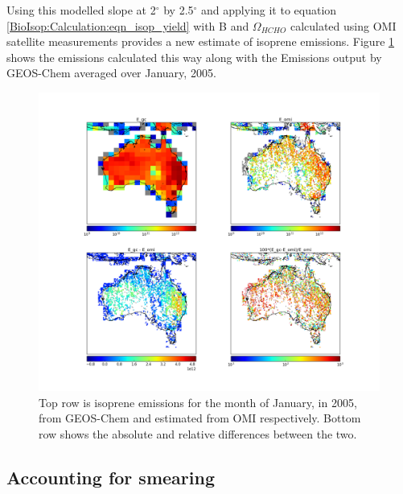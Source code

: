     Using this modelled slope at 2$^{\circ}$ by 2.5$^{\circ}$ and applying it to equation \ref{BioIsop:Calculation:eqn_isop_yield} with B and $\Omega_{HCHO}$ calculated using OMI satellite measurements provides a new estimate of isoprene emissions.
    Figure \ref{BioIsop:Calculation:fig_E_isop_200501} shows the emissions calculated this way along with the Emissions output by GEOS-Chem averaged over January, 2005.
    \begin{figure}[!htbp]
      \includegraphics[width=\textwidth]{Figures/Isoprene/E_Comparison.png}
      \caption{%
        Top row is isoprene emissions for the month of January, in 2005, from GEOS-Chem and estimated from OMI respectively.
        Bottom row shows the absolute and relative differences between the two.
      }
      \label{BioIsop:Calculation:fig_E_isop_200501}
    \end{figure}
    
  
  
  \subsection{Accounting for smearing}
    \label{BioIsop:Method:Smearing}
    
